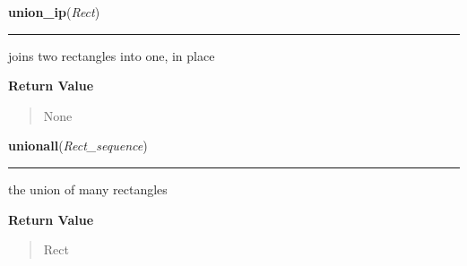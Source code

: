 \hspace{.8\funcindent}\begin{boxedminipage}{\funcwidth}

    \raggedright \textbf{union\_ip}(\textit{Rect})

    \vspace{-1.5ex}

    \rule{\textwidth}{0.5\fboxrule}
\setlength{\parskip}{2ex}
    joins two rectangles into one, in place

\setlength{\parskip}{1ex}
      \textbf{Return Value}
    \vspace{-1ex}

      \begin{quote}
      None

      \end{quote}

    \end{boxedminipage}

    \label{pygame:Rect:unionall}

    \vspace{0.5ex}

\hspace{.8\funcindent}\begin{boxedminipage}{\funcwidth}

    \raggedright \textbf{unionall}(\textit{Rect\_sequence})

    \vspace{-1.5ex}

    \rule{\textwidth}{0.5\fboxrule}
\setlength{\parskip}{2ex}
    the union of many rectangles

\setlength{\parskip}{1ex}
      \textbf{Return Value}
    \vspace{-1ex}

      \begin{quote}
      Rect

      \end{quote}

    \end{boxedminipage}

    \label{pygame:Rect:unionall_ip}

    \vspace{0.5ex}

